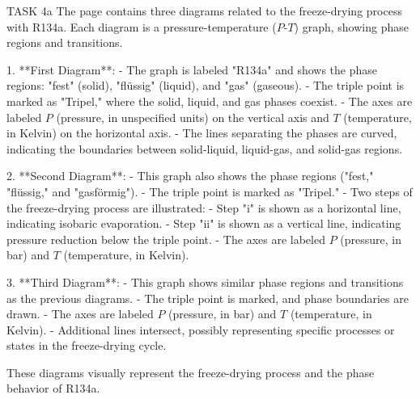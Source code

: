 TASK 4a  
The page contains three diagrams related to the freeze-drying process with R134a. Each diagram is a pressure-temperature (\( P \)-\( T \)) graph, showing phase regions and transitions.  

1. **First Diagram**:  
   - The graph is labeled "R134a" and shows the phase regions: "fest" (solid), "flüssig" (liquid), and "gas" (gaseous).  
   - The triple point is marked as "Tripel," where the solid, liquid, and gas phases coexist.  
   - The axes are labeled \( P \) (pressure, in unspecified units) on the vertical axis and \( T \) (temperature, in Kelvin) on the horizontal axis.  
   - The lines separating the phases are curved, indicating the boundaries between solid-liquid, liquid-gas, and solid-gas regions.  

2. **Second Diagram**:  
   - This graph also shows the phase regions ("fest," "flüssig," and "gasförmig").  
   - The triple point is marked as "Tripel."  
   - Two steps of the freeze-drying process are illustrated:  
     - Step "i" is shown as a horizontal line, indicating isobaric evaporation.  
     - Step "ii" is shown as a vertical line, indicating pressure reduction below the triple point.  
   - The axes are labeled \( P \) (pressure, in bar) and \( T \) (temperature, in Kelvin).  

3. **Third Diagram**:  
   - This graph shows similar phase regions and transitions as the previous diagrams.  
   - The triple point is marked, and phase boundaries are drawn.  
   - The axes are labeled \( P \) (pressure, in bar) and \( T \) (temperature, in Kelvin).  
   - Additional lines intersect, possibly representing specific processes or states in the freeze-drying cycle.  

These diagrams visually represent the freeze-drying process and the phase behavior of R134a.